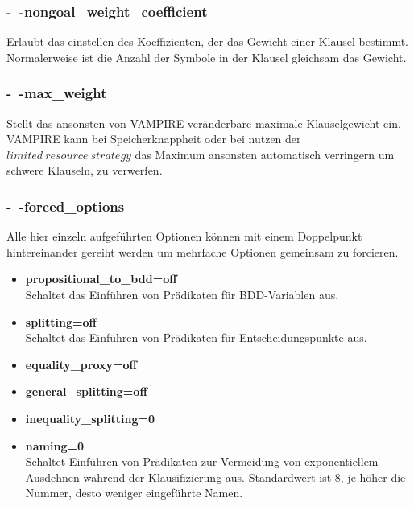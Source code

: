 \documentclass{acm_proc_article-sp-german}
\begin{document}
\subsubsection{-~-nongoal\_weight\_coefficient}
\label{subsubsec: commandweightcoefficient}
Erlaubt das einstellen des Koeffizienten, der das Gewicht einer Klausel bestimmt. Normalerweise ist die Anzahl der Symbole in der Klausel gleichsam das Gewicht.
\subsubsection{-~-max\_weight}
\label{subsubsec: commandmaxweight}
Stellt das ansonsten von VAMPIRE veränderbare maximale Klauselgewicht ein. VAMPIRE kann bei Speicherknappheit oder bei nutzen der $ limited~resource~strategy $ das Maximum ansonsten automatisch verringern um schwere Klauseln, zu verwerfen.
\subsubsection{-~-forced\_options}
\label{subsubsec: commandforcedoptions}
Alle hier einzeln aufgeführten Optionen können mit einem Doppelpunkt hintereinander gereiht werden um mehrfache Optionen gemeinsam zu forcieren. 
\begin{itemize}
	\item \textbf{propositional\_to\_bdd=off}\\
		Schaltet das Einführen von Prädikaten für BDD-Variablen aus. \\
	\item \textbf{splitting=off}\\
		Schaltet das Einführen von Prädikaten für Entscheidungspunkte aus. \\
	\item \textbf{equality\_proxy=off}\\
	\item \textbf{general\_splitting=off}\\
	\item \textbf{inequality\_splitting=0}\\
	\item \textbf{naming=0}\\
		Schaltet Einführen von Prädikaten zur Vermeidung von exponentiellem Ausdehnen während der Klausifizierung aus.
		Standardwert ist 8, je höher die Nummer, desto weniger eingeführte Namen.\\
\end{itemize}
	
\end{document}
